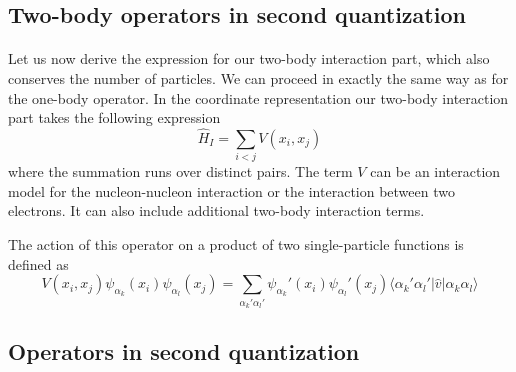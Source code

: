 \documentclass[%
twoside,                 %
final,                   %
10pt]{article}
\begin{document}
\subsection{Two-body operators in second quantization}

\paragraph{}
Let us now derive the expression for our two-body interaction part, which also conserves the number of particles.
We can proceed in exactly the same way as for the one-body operator. In the coordinate representation our
two-body interaction part takes the following expression
\begin{equation}
	\hat{H}_I = \sum_{i < j} V(x_i,x_j) \label{eq:2-31}
\end{equation}
where the summation runs over distinct pairs. The term $V$ can be an interaction model for the nucleon-nucleon interaction
or the interaction between two electrons. It can also include additional two-body interaction terms. 

The action of this operator on a product of 
two single-particle functions is defined as 
\begin{equation}
	V(x_i,x_j) \psi_{\alpha_k}(x_i) \psi_{\alpha_l}(x_j) = \sum_{\alpha_k'\alpha_l'} 
		\psi_{\alpha_k}'(x_i)\psi_{\alpha_l}'(x_j) 
		\langle \alpha_k'\alpha_l'|\hat{v}|\alpha_k\alpha_l\rangle \label{eq:2-32}
\end{equation}






\subsection{Operators in second quantization}

\end{document}
